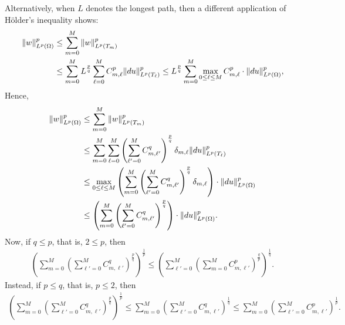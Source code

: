 \documentclass[10pt,a4paper]{article}
\begin{document}
Alternatively, when $L$ denotes the longest path, then a different application of H\"older's inequality shows:
    \begin{align*}
        \| w \|_{L^{p}(\Omega)}^{p}
        &
        \leq 
        \sum_{m=0}^{M}
        \| w \|_{L^{p}(T_{m})}^{p}
        \\&
        \leq 
        \sum_{m=0}^{M}
        L^{\frac p q}
        \sum_{\ell=0}^{M} C_{m,\ell}^{p} \| d u \|_{L^{p}(T_{\ell})}^{p} 
        \leq 
        L^{\frac p q}
        \sum_{m=0}^{M} 
        \max_{ 0 \leq \ell \leq M }
        C_{m,\ell}^{p} 
        \cdot 
        \| d u \|_{L^{p}(\Omega)}^{p} 
        ,
    \end{align*}
    Hence, 
    \begin{align}
        \| w \|_{L^{p}(\Omega)}^{p}
        &
        \leq 
        \sum_{m=0}^{M}
        \| w \|_{L^{p}(T_{m})}^{p}
        \\&
        \leq 
        \sum_{m=0}^{M}
        \sum_{\ell=0}^{M} 
        \left( \sum_{\ell'=0}^{M} C_{m,\ell'}^{q} \right)^{\frac p q}
        \delta_{m,\ell} \| d u \|_{L^{p}(T_{\ell})}^{p} 
        \\&
        \leq 
        \max_{0 \leq \ell \leq M} \left(
            \sum_{m=0}^{M}
            \left( \sum_{\ell'=0}^{M} C_{m,\ell'}^{q} \right)^{\frac p q}
            \delta_{m,\ell} 
        \right)
        \cdot 
        \| d u \|_{L^{p}(\Omega)}^{p} 
        \\&
        \leq 
        \left(
            \sum_{m=0}^{M}
            \left( \sum_{\ell'=0}^{M} C_{m,\ell'}^{q} \right)^{\frac p q}
        \right)
        \cdot 
        \| d u \|_{L^{p}(\Omega)}^{p} 
        .
    \end{align}
    Now, if $q \leq p$, that is, $2 \leq p$, then 
    \begin{align}
        \left(
            \sum_{m=0}^{M}
            \left( \sum_{\ell'=0}^{M} C_{m,\ell'}^{q} \right)^{\frac p q}
        \right)^{\frac 1 p}
        \leq 
        \left(
            \sum_{\ell'=0}^{M}
            \left( \sum_{m=0}^{M} C_{m,\ell'}^{p} \right)^{\frac q p}
        \right)^{\frac 1 q}
        .
    \end{align}
    Instead, if $p \leq q$, that is, $p \leq 2$, then 
    \begin{align}
        \left(
            \sum_{m=0}^{M}
            \left( \sum_{\ell'=0}^{M} C_{m,\ell'}^{q} \right)^{\frac p q}
        \right)^{\frac 1 p}
        \leq 
        \sum_{m=0}^{M}
        \left( \sum_{\ell'=0}^{M} C_{m,\ell'}^{q} \right)^{\frac 1 q}
        \leq 
        \sum_{m=0}^{M}
        \left( \sum_{\ell'=0}^{M} C_{m,\ell'}^{p} \right)^{\frac 1 p}
        .
    \end{align}
\end{document}

